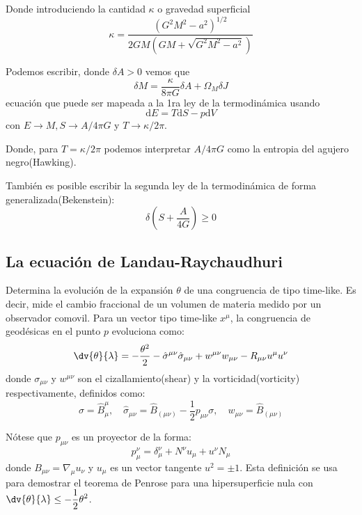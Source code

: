 \documentclass[../main]{subfiles}
\begin{document}
Donde introduciendo la cantidad $\kappa$ o gravedad superficial 
\begin{equation}
    \kappa=\dfrac{(G^2M^2-a^2)^{1/2}}{2GM(GM+\sqrt{G^2M^2-a^2})}
\end{equation}

Podemos escribir, donde $\delta A>0$ vemos que
\begin{equation}
    \delta M=\dfrac{\kappa}{8\pi G}\delta A+\Omega_M \delta J
\end{equation}
ecuación que puede ser mapeada a la 1ra ley de la termodinámica usando 
\begin{equation}
    \mathrm{d}E=T\mathrm{d}S-p\mathrm{d}V
\end{equation}
con $E\rightarrow M, S \rightarrow A/4\pi G$ y $T\rightarrow \kappa/2\pi$.

Donde, para $T=\kappa/2\pi$ podemos interpretar $A/4\pi G$ como la entropia del agujero negro(Hawking).

También es posible escribir la segunda ley de la termodinámica de forma generalizada(Bekenstein):
\begin{equation}
    \delta\left(S+\dfrac{A}{4G}\right)\geq 0
\end{equation}

\subsection{La ecuación de Landau-Raychaudhuri}
Determina la evolución de la expansión $\theta$ de una congruencia de tipo time-like. Es decir, mide el cambio fraccional de un volumen de materia medido por un observador comovil. Para un vector tipo time-like $x^{\mu}$, la congruencia de geodésicas en el punto $p$ evoluciona como:
\begin{equation}
    \dv{\theta}{\lambda}=-\dfrac{\theta^2}{2}-\hat{\sigma}^{\mu\nu}\hat{\sigma}_{\mu\nu}+w^{\mu\nu}w_{\mu\nu}-R_{\mu\nu}u^{\mu}u^{\nu}
\end{equation}
donde $\sigma_{\mu\nu}$ y $w^{\mu\nu}$ son el cizallamiento(shear) y la vorticidad(vorticity) respectivamente, definidos como:
\begin{equation}
    \sigma=\hat{B}^{\mu}_{\mu},\quad \hat{\sigma}_{\mu\nu}=\hat{B}_{(\mu\nu)}-\dfrac{1}{2}p_{\mu\nu}\sigma,\quad w_{\mu\nu}=\hat{B}_{(\mu\nu)}
\end{equation}

Nótese que $p_{\mu\nu}$ es un proyector de la forma:
\begin{equation}
    p^{\nu}_{\mu}=\delta^{\nu}_{\mu}+N^{\nu}u_{\mu}+u^{\nu}N_{\mu}
\end{equation}
donde $B_{\mu\nu}=\nabla_{\mu}u_{\nu}$ y $u_{\mu}$ es un vector tangente $u^2=\pm 1$. Esta definición se usa para demostrar el teorema de Penrose para una hipersuperficie nula con $\displaystyle \dv{\theta}{\lambda}\leq -\dfrac{1}{2}\theta^2$.
\end{document}
